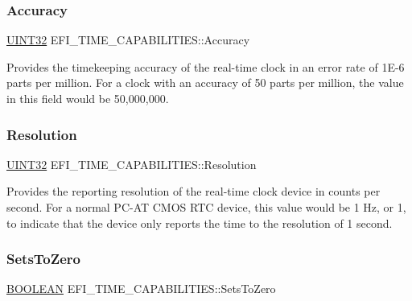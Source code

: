 \subsubsection{\texorpdfstring{Accuracy}{Accuracy}}
{\footnotesize\ttfamily \hyperlink{_processor_bind_8h_ae1e6edbbc26d6fbc71a90190d0266018}{U\+I\+N\+T32} E\+F\+I\+\_\+\+T\+I\+M\+E\+\_\+\+C\+A\+P\+A\+B\+I\+L\+I\+T\+I\+E\+S\+::\+Accuracy}

Provides the timekeeping accuracy of the real-\/time clock in an error rate of 1\+E-\/6 parts per million. For a clock with an accuracy of 50 parts per million, the value in this field would be 50,000,000. \mbox{\label{struct_e_f_i___t_i_m_e___c_a_p_a_b_i_l_i_t_i_e_s_a5e302cf166017eacf05df9de37f09338}} 
\subsubsection{\texorpdfstring{Resolution}{Resolution}}
{\footnotesize\ttfamily \hyperlink{_processor_bind_8h_ae1e6edbbc26d6fbc71a90190d0266018}{U\+I\+N\+T32} E\+F\+I\+\_\+\+T\+I\+M\+E\+\_\+\+C\+A\+P\+A\+B\+I\+L\+I\+T\+I\+E\+S\+::\+Resolution}

Provides the reporting resolution of the real-\/time clock device in counts per second. For a normal P\+C-\/\+AT C\+M\+OS R\+TC device, this value would be 1 Hz, or 1, to indicate that the device only reports the time to the resolution of 1 second. \mbox{\label{struct_e_f_i___t_i_m_e___c_a_p_a_b_i_l_i_t_i_e_s_ab2dce3f0b8c903fb192b57d2b9b3df47}} 
\subsubsection{\texorpdfstring{Sets\+To\+Zero}{SetsToZero}}
{\footnotesize\ttfamily \hyperlink{_processor_bind_8h_a112e3146cb38b6ee95e64d85842e380a}{B\+O\+O\+L\+E\+AN} E\+F\+I\+\_\+\+T\+I\+M\+E\+\_\+\+C\+A\+P\+A\+B\+I\+L\+I\+T\+I\+E\+S\+::\+Sets\+To\+Zero}

